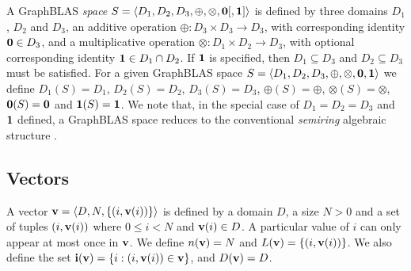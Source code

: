 \documentclass[11pt]{extarticle}
\begin{document}
A GraphBLAS \emph{space} $S=\langle D_1,D_2,D_3,\oplus,\otimes,{\bf 0} [,{\bf 1}] \rangle$ is defined by three domains $D_1$, $D_2$ and $D_3$, an additive 
operation $\oplus : D_3 \times D_3 \rightarrow D_3$, with corresponding identity ${\bf 0} \in D_3$, and a multiplicative
operation $\otimes : D_1 \times D_2 \rightarrow D_3$, with optional corresponding identity ${\bf 1} \in D_1 \cap D_2$. 
If ${\bf 1}$ is specified, then $D_1 \subseteq D_3$ and $D_2 \subseteq D_3$ must be satisfied. For a given GraphBLAS
space $S=\langle D_1, D_2, D_3,\oplus,\otimes,{\bf 0},{\bf 1} \rangle$ we define $D_1(S) = D_1$, $D_2(S) = D_2$, $D_3(S) = D_3$, $\oplus(S) = \oplus$,
$\otimes(S) = \otimes$, ${\bf 0}(S) = {\bf 0}$ and ${\bf 1}(S) = {\bf 1}$. We note that, in the special case of $D_1 = D_2 = D_3$ and ${\bf 1}$ defined,
a GraphBLAS space reduces to the conventional \emph{semiring} algebraic structure .






\subsection{Vectors}

A vector ${\bf v} = \langle D, N, \{ (i,{\bf v}(i)) \} \rangle$ is defined by a domain $D$, a size $N>0$ and a set of tuples
$(i,{\bf v}(i))$ where $0 \leq i < N$ and ${\bf v}(i) \in D$. A
particular value of $i$ can only appear at most once in ${\bf v}$. We define $n({\bf v}) = N$ and $L({\bf v}) = \{ (i,{\bf v}(i)) \}$. We
also define the set ${\bf i({\bf v})} = \{ i : (i,{\bf v}(i))
\in {\bf v} \}$, and $D({\bf v}) = D$.
\end{document}
